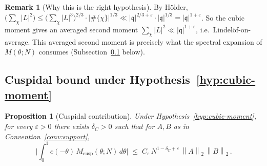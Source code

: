 \documentclass[11pt]{article}
\newtheorem{proposition}[theorem]{Proposition}
\theoremstyle{definition}
\newtheorem{remark}[theorem]{Remark}
\newcommand{\norm}[1]{\left\lVert #1\right\rVert}
\newcommand{\qq}{\mathfrak{q}}
\begin{document}
\begin{remark}[Why this is the right hypothesis]\label{rem:hyp-right}
By Hölder, $\Big(\sum_\chi|L|^2\Big)\le\Big(\sum_\chi|L|^3\Big)^{2/3}\cdot|\#\{\chi\}|^{1/3}\ll|\qq|^{2/3+\varepsilon}\cdot|\qq|^{1/3}=|\qq|^{1+\varepsilon}$. So the cubic moment gives an averaged second moment $\sum_\chi|L|^2\ll|\qq|^{1+\varepsilon}$, i.e.\ Lindelöf-on-average. This averaged second moment is precisely what the spectral expansion of $M(\theta;N)$ consumes (Subsection~\ref{ssec:cuspidal-bound} below).
\end{remark}

\subsection{Cuspidal bound under Hypothesis~\ref{hyp:cubic-moment}}\label{ssec:cuspidal-bound}

\begin{proposition}[Cuspidal contribution]\label{prop:cuspidal}
Under Hypothesis~\ref{hyp:cubic-moment}, for every $\varepsilon>0$ there exists $\delta_C>0$ such that for $A,B$ as in Convention~\ref{conv:support},
\[
   \Big|\int_0^1 e(-\theta)\,M_{\text{cusp}}(\theta;N)\,d\theta\Big|\;\le\;C_\varepsilon\,N^{1-\delta_C+\varepsilon}\,\norm{A}_2\,\norm{B}_2\,.
\]
\end{proposition}
\end{document}
